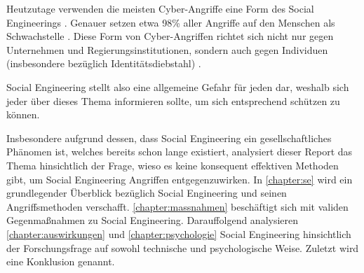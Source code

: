 Heutzutage verwenden die meisten Cyber-Angriffe eine Form des Social Engineerings .
Genauer setzen etwa 98\% aller Angriffe auf den Menschen als Schwachstelle .
Diese Form von Cyber-Angriffen richtet sich nicht nur gegen Unternehmen und Regierungsinstitutionen,
sondern auch gegen Individuen (insbesondere bezüglich Identitätsdiebstahl) .

Social Engineering stellt also eine allgemeine Gefahr für jeden dar, weshalb sich jeder über dieses
Thema informieren sollte, um sich entsprechend schützen zu können.

Insbesondere aufgrund dessen, dass Social Engineering ein gesellschaftliches Phänomen ist, welches bereits
schon lange existiert, analysiert dieser Report das Thema hinsichtlich der Frage, wieso es keine konsequent effektiven
Methoden gibt, um Social Engineering Angriffen entgegenzuwirken.
In \autoref{chapter:se} wird ein grundlegender Überblick bezüglich Social Engineering und seinen Angriffsmethoden verschafft.
\autoref{chapter:massnahmen} beschäftigt sich mit validen Gegenmaßnahmen zu Social Engineering.
Darauffolgend analysieren \autoref{chapter:auswirkungen} und \autoref{chapter:psychologie} Social Engineering hinsichtlich der
Forschungsfrage auf sowohl technische und psychologische Weise. Zuletzt wird eine Konklusion genannt.
